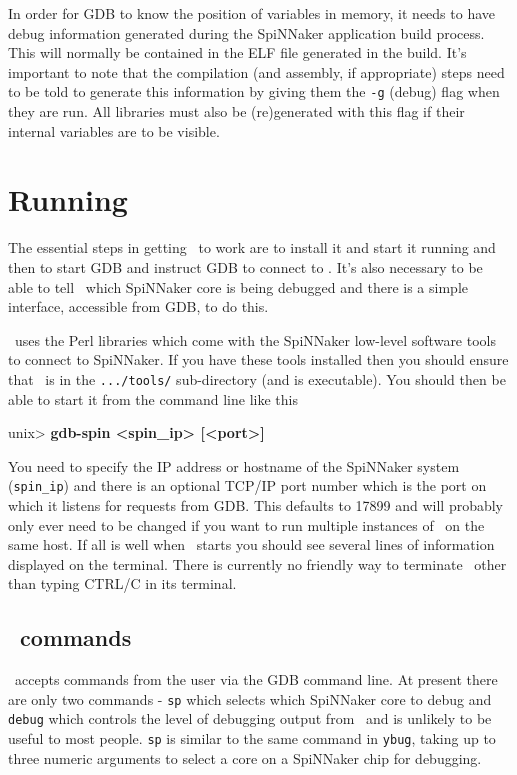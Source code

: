 In order for GDB to know the position of variables in memory, it needs
to have debug information generated during the SpiNNaker application
build process. This will normally be contained in the ELF file
generated in the build. It's important to note that the compilation
(and assembly, if appropriate) steps need to be told to generate this
information by giving them the \texttt{-g} (debug) flag when they are
run. All libraries must also be (re)generated with this flag if their
internal variables are to be visible.

\section{Running \gdbspin}

The essential steps in getting \gdbspin\ to work are to install it and
start it running and then to start GDB and instruct GDB to connect
to \gdbspin. It's also necessary to be able to tell \gdbspin\ which
SpiNNaker core is being debugged and there is a simple interface,
accessible from GDB, to do this.

\gdbspin\ uses the Perl libraries which come with the SpiNNaker
low-level software tools to connect to SpiNNaker. If you have these
tools installed then you should ensure that \gdbspin\ is in
the \texttt{.../tools/} sub-directory (and is executable). You should
then be able to start it from the command line like this

\begin{shell}
unix> \textbf{gdb-spin <spin\_ip> [<port>]}
\end{shell}

You need to specify the IP address or hostname of the SpiNNaker system
(\texttt{spin\_ip}) and there is an optional TCP/IP port number which
is the port on which it listens for requests from GDB. This defaults
to 17899 and will probably only ever need to be changed if you want to
run multiple instances of \gdbspin\ on the same host. If all is well
when \gdbspin\ starts you should see several lines of information
displayed on the terminal. There is currently no friendly way to
terminate \gdbspin\ other than typing CTRL/C in its terminal.

\subsection{\gdbspin\ commands}

\gdbspin\ accepts commands from the user via the GDB command
line. At present there are only two commands -
\texttt{sp} which selects which SpiNNaker core to debug and
\texttt{debug} which controls the level of debugging output from
\gdbspin\ and is unlikely to be useful to most people.
\texttt{sp} is similar to the same command in \texttt{ybug}, taking
up to three numeric arguments to select a core on a SpiNNaker chip
for debugging.

